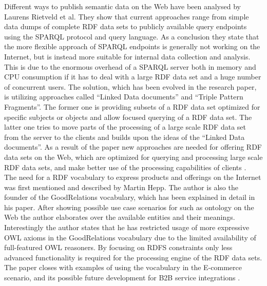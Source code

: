 Different ways to publish semantic data on the Web have been analysed by Laurens Rietveld et al. They show that current approaches range from simple data dumps of complete \gls{RDF} data sets to publicly available query endpoints using the \gls{SPARQL} protocol and query language. As a conclusion they state that the more flexible approach of \gls{SPARQL} endpoints is generally not working on the Internet, but is instead more suitable for internal data collection and analysis. This is due to the enormous overhead of a \gls{SPARQL} server both in memory and CPU consumption if it has to deal with a large \gls{RDF} data set and a huge number of concurrent users. The solution, which has been evolved in the research paper, is utilizing approaches called ``Linked Data documents'' and ``Triple Pattern Fragments''. The former one is providing subsets of a \gls{RDF} data set optimized for specific subjects or objects and allow focused querying of a \gls{RDF} data set. The latter one tries to move parts of the processing of a large scale \gls{RDF} data set from the server to the clients and builds upon the ideas of the ``Linked Data documents''. As a result of the paper new approaches are needed for offering \gls{RDF} data sets on the Web, which are optimized for querying and processing large scale \gls{RDF} data sets, and make better use of the processing capabilities of clients \citep{rietveld2015linked}. \\

The need for a \gls{RDF} vocabulary to express products and offerings on the Internet was first mentioned and described by Martin Hepp. The author is also the founder of the GoodRelations vocabulary, which has been explained in detail in his paper. After showing possible use case scenarios for such as ontology on the Web the author elaborates over the available entities and their meanings. Interestingly the author states that he has restricted usage of more expressive \gls{OWL} axioms in the GoodRelations vocabulary due to the limited availability of full-featured \gls{OWL} reasoners. By focusing on \gls{RDFS} constraints only less advanced functionality is required for the processing engine of the \gls{RDF} data sets. The paper closes with examples of using the vocabulary in the \gls{E-commerce} scenario, and its possible future development for \gls{B2B} service integrations \citep{hepp2008goodrelations}. \\

